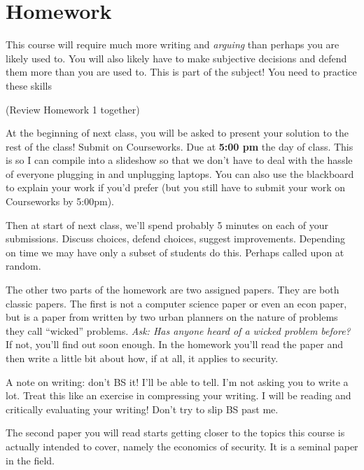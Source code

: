 \documentclass[11pt]{article}
\begin{document}
\section{Homework}

This course will require much more writing and {\it arguing} than perhaps you are likely used to.
You will also likely have to make subjective decisions and defend them more than you are used to. This is part of the subject! You need to practice these skills

(Review Homework 1 together)

At the beginning of next class, you will be asked to present your solution to the rest of the class! Submit on Courseworks. Due at {\bf 5:00 pm} the day of class. This is so I can compile into a slideshow so that we don't have to deal with the hassle of everyone plugging in and unplugging laptops. You can also use the blackboard to explain your work if you'd prefer (but you still have to submit your work on Courseworks by 5:00pm).

Then at start of next class, we'll spend probably 5 minutes on each of your submissions. Discuss choices, defend choices, suggest improvements. Depending on time we may have only a subset of students do this. Perhaps called upon at random. 

The other two parts of the homework are two assigned papers. They are both classic papers.
The first is not a computer science paper or even an econ paper, but is a paper from written by two urban planners on the nature of problems they call ``wicked'' problems. {\it Ask: Has anyone heard of a wicked problem before?} If not, you'll find out soon enough. In the homework you'll read the paper and then write a little bit about how, if at all, it applies to security. 

A note on writing: don't BS it! I'll be able to tell. I'm not asking you to write a lot. Treat this like an exercise in compressing your writing. I will be reading and critically evaluating your writing! Don't try to slip BS past me. 

The second paper you will read starts getting closer to the topics this course is actually intended to cover, namely the economics of security. It is a seminal paper in the field.
\end{document}
